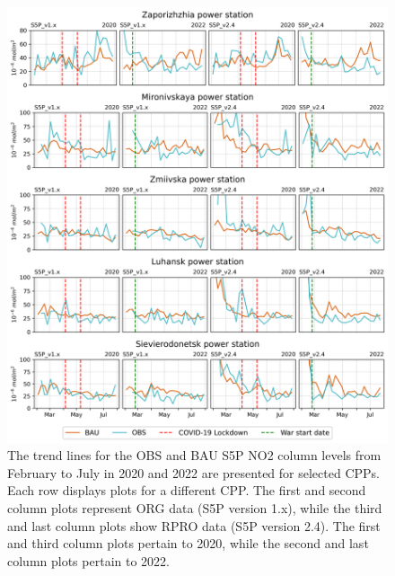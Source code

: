 \begin{figure}
    \centering
    \includegraphics[width=\textwidth]{figs/chap3/fig9.png}
    \caption[OBS and BAU S5P NO2 trends (2020-2022) for selected CPPs]{The trend lines for the OBS and BAU S5P NO2 column levels from February to July in 2020 and 2022 are presented for selected CPPs. Each row displays plots for a different CPP. The first and second column plots represent ORG data (S5P version 1.x), while the third and last column plots show RPRO data (S5P version 2.4). The first and third column plots pertain to 2020, while the second and last column plots pertain to 2022.}
    \label{fig:chap3_fig9}
\end{figure}
